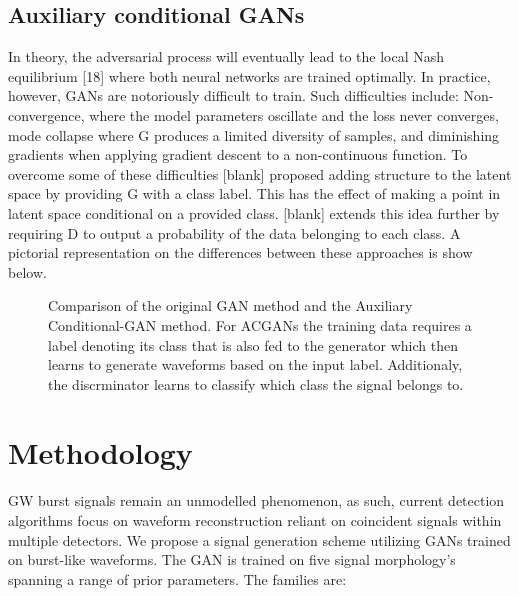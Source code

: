 \documentclass[12pt]{iopart}
\begin{document}
\subsection{Auxiliary conditional GANs}
In theory, the adversarial process will eventually lead to the local Nash equilibrium [18] where
both neural networks are trained optimally. In practice, however, GANs are
notoriously difficult to train. Such difficulties include: Non-convergence,
where the model parameters oscillate and the loss never converges, mode
collapse where G produces a limited diversity of samples, and diminishing
gradients when applying gradient descent to a
non-continuous function. To overcome some of these difficulties [blank]
proposed adding structure to the latent space by providing G with a class
label. This has the effect of making a point in latent space conditional on a
provided class. [blank] extends this idea further by requiring D to output a
probability of the data belonging to each class. A pictorial representation on the differences between these approaches is show below. 

\begin{figure}[h!]
    \centering
    \caption{Comparison of the original GAN method and the Auxiliary Conditional-GAN method. For ACGANs the training data requires a label denoting its class that is also fed to the generator which then learns to generate waveforms based on the input label. Additionaly, the discrminator learns to classify which class the signal belongs to.}
\end{figure}

\section{Methodology}
GW burst signals remain an unmodelled phenomenon, as such, current detection algorithms focus on waveform reconstruction reliant on coincident signals within multiple detectors. We propose a signal generation scheme utilizing GANs trained on burst-like waveforms. The GAN is trained on five signal morphology's spanning a range of prior parameters. The families are:
\end{document}
